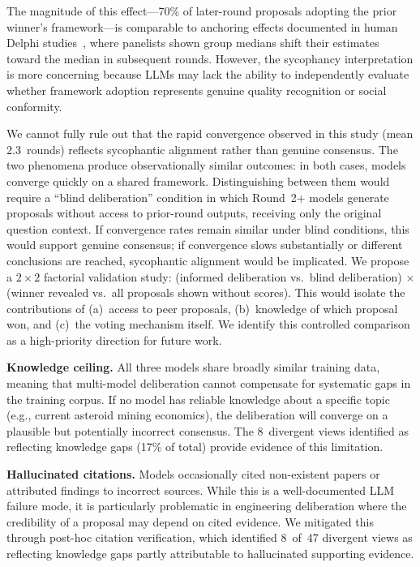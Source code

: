 \documentclass[11pt,a4paper]{article}
\begin{document}
The magnitude of this effect---70\% of later-round proposals adopting the prior winner's framework---is comparable to anchoring effects documented in human Delphi studies~\cite{linstone1975delphi}, where panelists shown group medians shift their estimates toward the median in subsequent rounds. However, the sycophancy interpretation is more concerning because LLMs may lack the ability to independently evaluate whether framework adoption represents genuine quality recognition or social conformity.

We cannot fully rule out that the rapid convergence observed in this study (mean 2.3~rounds) reflects sycophantic alignment rather than genuine consensus. The two phenomena produce observationally similar outcomes: in both cases, models converge quickly on a shared framework. Distinguishing between them would require a ``blind deliberation'' condition in which Round~2+ models generate proposals without access to prior-round outputs, receiving only the original question context. If convergence rates remain similar under blind conditions, this would support genuine consensus; if convergence slows substantially or different conclusions are reached, sycophantic alignment would be implicated. We propose a $2\times2$ factorial validation study: (informed deliberation vs.\ blind deliberation) $\times$ (winner revealed vs.\ all proposals shown without scores). This would isolate the contributions of (a)~access to peer proposals, (b)~knowledge of which proposal won, and (c)~the voting mechanism itself. We identify this controlled comparison as a high-priority direction for future work.

\textbf{Knowledge ceiling.} All three models share broadly similar training data, meaning that multi-model deliberation cannot compensate for systematic gaps in the training corpus. If no model has reliable knowledge about a specific topic (e.g., current asteroid mining economics), the deliberation will converge on a plausible but potentially incorrect consensus. The 8~divergent views identified as reflecting knowledge gaps (17\% of total) provide evidence of this limitation.

\textbf{Hallucinated citations.} Models occasionally cited non-existent papers or attributed findings to incorrect sources. While this is a well-documented LLM failure mode, it is particularly problematic in engineering deliberation where the credibility of a proposal may depend on cited evidence. We mitigated this through post-hoc citation verification, which identified 8~of~47 divergent views as reflecting knowledge gaps partly attributable to hallucinated supporting evidence.
\end{document}
